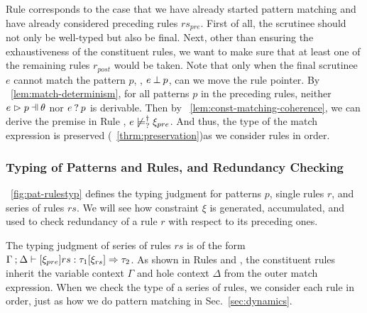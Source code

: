 \documentclass[runningheads,envcountsame,a4paper]{llncs}
\begin{document}
Rule \TMatchNZPre corresponds to the case that we have already started pattern
matching and have already considered preceding rules $rs_{pre}$. First of all,
the scrutinee should not only be well-typed but also be final. Next, other than
ensuring the exhaustiveness of the constituent rules, we want to make sure that
at least one of the remaining rules $r_{post}$ would be taken. Note
that only when the final scrutinee $e$ cannot match the pattern $p$, \ie,
$e \mathbin{\bot} p$, can we move the rule pointer. By
\lemmaname~\ref{lem:match-determinism}, for all patterns $p$ in the preceding
rules, neither $\hpatmatch{e}{p}{\theta}$ nor $e \mathbin{?} p$ is derivable.
Then by \lemmaname~\ref{lem:const-matching-coherence}, we can derive the premise
in Rule \TMatchNZPre, $e \not\models_{?}^{\dag} \xi_{pre}$. And thus, the type of
the match expression is preserved (\theoremname~\ref{thrm:preservation})as we consider rules in order.

\subsubsection{Typing of Patterns and Rules, and Redundancy Checking}
\label{sec:pattyp}


\figurename~\ref{fig:pat-rulestyp} defines the typing judgment for patterns $p$,
single rules $r$, and series of rules $rs$. We will see how constraint $\xi$ is
generated, accumulated, and used to check redundancy of a rule $r$ with respect
to its preceding ones.

The typing judgment of series of rules $rs$ is of the form
$\Gamma \mathbin{;} \Delta \vdash [\xi_{pre}] rs : \tau_1 [\xi_{rs}] \Rightarrow \tau_2$. As shown
in Rules \TMatchZPre and \TMatchNZPre, the constituent rules inherit the
variable context $\Gamma$ and hole context $\Delta$ from the outer match
expression. When we check the type of a series of rules, we consider each rule
in order, just as how we do pattern matching in Sec.~\ref{sec:dynamics}.
\end{document}

